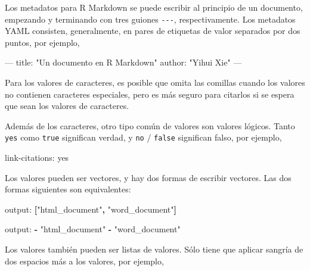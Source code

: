 \documentclass[12pt,]{krantz}
\makeatletter
\newenvironment{Shaded}{\begin{snugshade}}{\end{snugshade}}
\newcommand{\KeywordTok}[1]{\textcolor[rgb]{0.13,0.29,0.53}{\textbf{#1}}}
\newcommand{\StringTok}[1]{\textcolor[rgb]{0.31,0.60,0.02}{#1}}
\newcommand{\OtherTok}[1]{\textcolor[rgb]{0.56,0.35,0.01}{#1}}
\newcommand{\FunctionTok}[1]{\textcolor[rgb]{0.00,0.00,0.00}{#1}}
\newcommand{\AttributeTok}[1]{\textcolor[rgb]{0.77,0.63,0.00}{#1}}
\newenvironment{kframe}{%
\medskip{}
\setlength{\fboxsep}{.8em}
 \def\at@end@of@kframe{}%
 \ifinner\ifhmode%
  \def\at@end@of@kframe{\end{minipage}}%
  \begin{minipage}{\columnwidth}%
 \fi\fi%
 \def\FrameCommand##1{\hskip\@totalleftmargin \hskip-\fboxsep
 \colorbox{shadecolor}{##1}\hskip-\fboxsep
     \hskip-\linewidth \hskip-\@totalleftmargin \hskip\columnwidth}%
 \MakeFramed {\advance\hsize-\width
   \@totalleftmargin\z@ \linewidth\hsize
   \@setminipage}}%
 {\par\unskip\endMakeFramed%
 \at@end@of@kframe}
\renewenvironment{Shaded}{\begin{kframe}}{\end{kframe}}
\theoremstyle{definition}
\theoremstyle{definition}
\theoremstyle{definition}
\theoremstyle{remark}
\makeatother
\begin{document}
Los metadatos para R Markdown se puede escribir al principio de un
documento, empezando y terminando con tres guiones \texttt{-\/-\/-},
respectivamente. Los metadatos YAML consisten, generalmente, en pares de
etiquetas de valor separados por dos puntos, por ejemplo,

\begin{Shaded}
\begin{Highlighting}[]
\OtherTok{---}
\FunctionTok{title:}\AttributeTok{ }\StringTok{"Un documento en R Markdown"}
\FunctionTok{author:}\AttributeTok{ }\StringTok{"Yihui Xie"}
\OtherTok{---}
\end{Highlighting}
\end{Shaded}

Para los valores de caracteres, es posible que omita las comillas cuando
los valores no contienen caracteres especiales, pero es más seguro para
citarlos si se espera que sean los valores de caracteres.

Además de los caracteres, otro tipo común de valores son valores
lógicos. Tanto \texttt{yes} como \texttt{true} significan verdad, y
\texttt{no} / \texttt{false} significan falso, por ejemplo,

\begin{Shaded}
\begin{Highlighting}[]
\FunctionTok{link-citations:}\AttributeTok{ yes}
\end{Highlighting}
\end{Shaded}

Los valores pueden ser vectores, y hay dos formas de escribir vectores.
Las dos formas siguientes son equivalentes:

\begin{Shaded}
\begin{Highlighting}[]
\FunctionTok{output:}\AttributeTok{ }\KeywordTok{[}\StringTok{"html_document"}\KeywordTok{,} \StringTok{"word_document"}\KeywordTok{]}
\end{Highlighting}
\end{Shaded}

\begin{Shaded}
\begin{Highlighting}[]
\FunctionTok{output:}
  \KeywordTok{-} \StringTok{"html_document"}
  \KeywordTok{-} \StringTok{"word_document"}
\end{Highlighting}
\end{Shaded}

Los valores también pueden ser listas de valores. Sólo tiene que aplicar
sangría de dos espacios más a los valores, por ejemplo,
\end{document}
